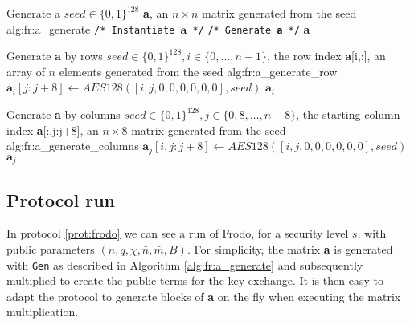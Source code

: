 \begin{b_algorithm}{Generate a}
{$seed \in \{0,1\}^{128}$}
{\textbf{a}, an $n\times n$ matrix generated from the seed}
{alg:fr:a_generate}
\STATE \texttt{/* Instantiate $\bar{\textbf{a}}$ */}
\ENDFOR
\STATE \texttt{/* Generate \textbf{a} */}
\ENDFOR
\RETURN \textbf{a}
\end{b_algorithm}

\begin{b_algorithm}{Generate \textbf{a} by rows}
{$seed \in \{0,1\}^{128},i \in \{0,\ldots,n-1\}$, the row index}
{\textbf{a}[i,:], an array of $n$ elements generated from the seed}
{alg:fr:a_generate_row}
\STATE $\textbf{a}_i[j:j+8] \gets AES128([i,j,0,0,0,0,0,0], seed)$
\ENDFOR
\RETURN $\textbf{a}_i$
\end{b_algorithm}

\begin{b_algorithm}{Generate \textbf{a} by columns}
{$seed \in \{0,1\}^{128}, j\in \{0,8,\ldots,n-8\}$, the starting column index}
{\textbf{a}[:,j:j+8], an $n\times 8$ matrix generated from the seed}
{alg:fr:a_generate_columns}
\STATE $\textbf{a}_j[i,j:j+8] \gets AES128([i,j,0,0,0,0,0,0], seed)$
\ENDFOR
\RETURN $\textbf{a}_j$
\end{b_algorithm}

\subsection{Protocol run}
In protocol \ref{prot:frodo} we can see a run of Frodo, for a security level $s$, with public parameters $(n,q,\chi,\bar{n},\bar{m},B)$. For simplicity, the matrix \textbf{a} is generated with \verb|Gen| as described in Algorithm \ref{alg:fr:a_generate} and subsequently multiplied to create the public terms for the key exchange. It is then  easy to adapt the protocol to generate blocks of \textbf{a} on the fly when executing the matrix multiplication.\\

